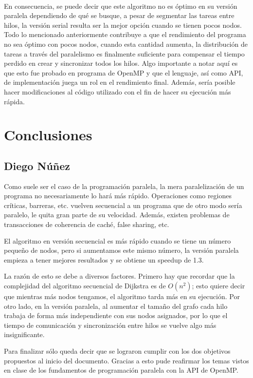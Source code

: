 \documentclass[11pt]{article}
\begin{document}
\paragraph{}
En consecuencia, se puede decir que este algoritmo no es óptimo en su versión paralela dependiendo de qué se busque, a pesar de segmentar las tareas entre hilos, la versión serial resulta ser la mejor opción cuando se tienen pocos nodos. Todo lo mencionado anteriormente contribuye a que el rendimiento del programa no sea óptimo con pocos nodos, cuando esta cantidad aumenta, la distribución de tareas a través del paralelismo es finalmente suficiente para compensar el tiempo perdido en crear y sincronizar todos los hilos. Algo importante a notar aquí es que esto fue probado en programa de OpenMP y que el lenguaje, así como API, de implementación juega un rol en el rendimiento final. Además, sería posible hacer modificaciones al código utilizado con el fin de hacer su ejecución más rápida.

\section{Conclusiones}
\subsection{Diego Núñez}
Como suele ser el caso de la programación paralela, la mera paralelización de un programa no necesariamente lo hará más rápido. Operaciones como regiones críticas, barreras, etc. vuelven secuencial a un programa que de otro modo sería paralelo, le quita gran parte de su velocidad. Además, existen problemas de transacciones de coherencia de caché, false sharing, etc.
\par
El algoritmo en versión secuencial es más rápido cuando se tiene un número pequeño de nodos, pero si aumentamos este mismo número, la versión paralela empieza a tener mejores resultados y se obtiene un speedup de 1.3.
\par
La razón de esto se debe a diversos factores. Primero hay que recordar que la complejidad del algoritmo secuencial de Dijkstra es de $O(n^2)$; esto quiere decir que mientras más nodos tengamos, el algoritmo tarda más en su ejecución. Por otro lado, en la versión paralela, al aumentar el tamaño del grafo cada hilo trabaja de forma más independiente con sus nodos asignados, por lo que el tiempo de comunicación y sincronización entre hilos se vuelve algo más insignificante. 
\par
Para finalizar sólo queda decir que se lograron cumplir con los dos objetivos propuestos al inicio del documento. Gracias a esto pude reafirmar los temas vistos en clase de los fundamentos de programación paralela con la API de OpenMP.
\end{document}
